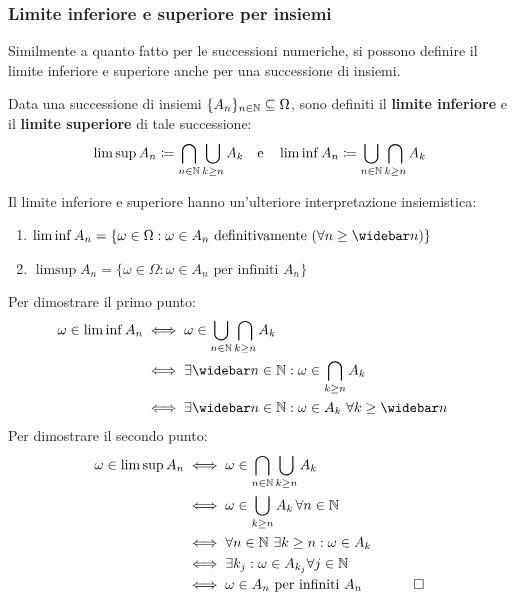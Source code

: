 \subsubsection{Limite inferiore e superiore per insiemi}
Similmente a quanto fatto per le successioni numeriche, si possono definire il limite inferiore e superiore anche per una successione di insiemi.
\begin{defn}
	Data una successione di insiemi $\{A_n\}_{n \in \mathbb N} \subseteq \Omega$, sono definiti il \textbf{limite inferiore} e il \textbf{limite superiore} di tale successione:
	$$\limsup A_n \coloneqq \bigcap_{n \in \mathbb N}{\bigcup_{k \ge n} A_k} 
	\quad \text{e} \quad
	\liminf A_n \coloneqq \bigcup_{n \in \mathbb N}{\bigcap_{k \ge n} A_k}$$
\end{defn}

\begin{prop}
	Il limite inferiore e superiore hanno un'ulteriore interpretazione insiemistica:
	\begin{enumerate}
		\item $\liminf A_n = \{ \omega \in \Omega : \omega \in  A_n \text{ definitivamente } (\forall n \ge \widebar n) \}$
		\item $\limsup A_n = \{ \omega \in \Omega : \omega \in A_n \text{ per infiniti } A_n \} $
	\end{enumerate}
\end{prop}

\begin{dimo}
	Per dimostrare il primo punto:
	\begin{align*}
		\omega \in \liminf A_n 
		& \iff \omega \in \bigcup_{n \in \NN}{\bigcap_{k \ge n} A_k} \\
		& \iff \exists \widebar n \in \NN : \omega \in \bigcap_{k \ge n} A_k & \\
		& \iff \exists \widebar n \in \NN : \omega \in A_k \ \forall k \ge \widebar n
	\end{align*}
	Per dimostrare il secondo punto:
	\begin{align*}
		\omega \in \limsup A_n 
		& \iff \omega \in \bigcap_{n \in \mathbb N}{\bigcup_{k \ge n}A_k} \\
		& \iff \omega \in \bigcup_{k \ge n}A_k \, \forall n \in \mathbb N \\
		& \iff \forall n \in \mathbb N \ \exists k \ge n : \omega \in A_k \\
		& \iff \exists k_j : \omega \in A_{k_j} \forall j \in \mathbb N \\
		& \iff \omega \in A_n \text{ per infiniti } A_n & \qedhere
	\end{align*}
\end{dimo}

